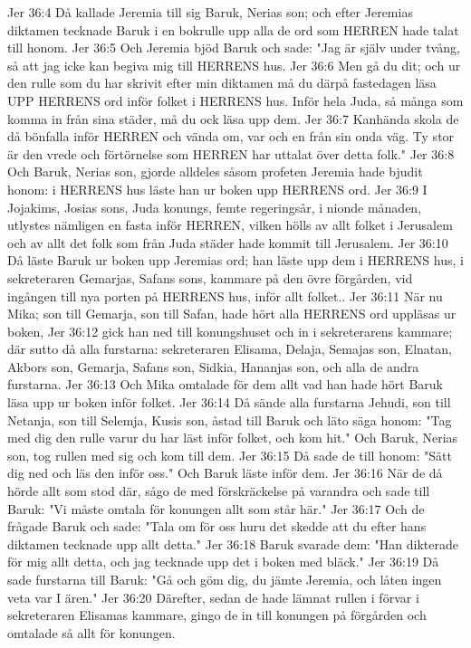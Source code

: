 Jer 36:4  Då kallade Jeremia till sig Baruk, Nerias son; och efter Jeremias diktamen tecknade Baruk i en bokrulle upp alla de ord som HERREN hade talat till honom.
Jer 36:5  Och Jeremia bjöd Baruk och sade: "Jag är själv under tvång, så att jag icke kan begiva mig till HERRENS hus.
Jer 36:6  Men gå du dit; och ur den rulle som du har skrivit efter min diktamen må du därpå fastedagen läsa UPP HERRENS ord inför folket i HERRENS hus. Inför hela Juda, så många som komma in från sina städer, må du ock läsa upp dem.
Jer 36:7  Kanhända skola de då bönfalla inför HERREN och vända om, var och en från sin onda väg. Ty stor är den vrede och förtörnelse som HERREN har uttalat över detta folk."
Jer 36:8  Och Baruk, Nerias son, gjorde alldeles såsom profeten Jeremia hade bjudit honom: i HERRENS hus läste han ur boken upp HERRENS ord.
Jer 36:9  I Jojakims, Josias sons, Juda konungs, femte regeringsår, i nionde månaden, utlystes nämligen en fasta inför HERREN, vilken hölls av allt folket i Jerusalem och av allt det folk som från Juda städer hade kommit till Jerusalem.
Jer 36:10  Då läste Baruk ur boken upp Jeremias ord; han läste upp dem i HERRENS hus, i sekreteraren Gemarjas, Safans sons, kammare på den övre förgården, vid ingången till nya porten på HERRENS hus, inför allt folket..
Jer 36:11  När nu Mika; son till Gemarja, son till Safan, hade hört alla HERRENS ord uppläsas ur boken,
Jer 36:12  gick han ned till konungshuset och in i sekreterarens kammare; där sutto då alla furstarna: sekreteraren Elisama, Delaja, Semajas son, Elnatan, Akbors son, Gemarja, Safans son, Sidkia, Hananjas son, och alla de andra furstarna.
Jer 36:13  Och Mika omtalade för dem allt vad han hade hört Baruk läsa upp ur boken inför folket.
Jer 36:14  Då sände alla furstarna Jehudi, son till Netanja, son till Selemja, Kusis son, åstad till Baruk och läto säga honom: "Tag med dig den rulle varur du har läst inför folket, och kom hit." Och Baruk, Nerias son, tog rullen med sig och kom till dem.
Jer 36:15  Då sade de till honom: "Sätt dig ned och läs den inför oss." Och Baruk läste inför dem.
Jer 36:16  När de då hörde allt som stod där, sågo de med förskräckelse på varandra och sade till Baruk: "Vi måste omtala för konungen allt som står här."
Jer 36:17  Och de frågade Baruk och sade: "Tala om för oss huru det skedde att du efter hans diktamen tecknade upp allt detta."
Jer 36:18  Baruk svarade dem: "Han dikterade för mig allt detta, och jag tecknade upp det i boken med bläck."
Jer 36:19  Då sade furstarna till Baruk: "Gå och göm dig, du jämte Jeremia, och låten ingen veta var I ären."
Jer 36:20  Därefter, sedan de hade lämnat rullen i förvar i sekreteraren Elisamas kammare, gingo de in till konungen på förgården och omtalade så allt för konungen.
